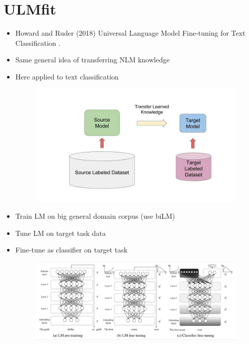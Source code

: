 \section{ULMfit}
\begin{itemize}
\item Howard and Ruder (2018) Universal Language Model Fine-tuning for Text Classification \cite{howard-ruder-2018-universal}. 
\item Same general idea of transferring NLM knowledge
\item  Here applied to text classification

\begin{figure}[h]
        	\includegraphics[scale = 0.29]{pics/ulmfit1.png}
        \end{figure}  

\item Train LM on big general domain corpus (use biLM)
\item Tune LM on target task data
\item Fine-tune as classifier on target task

\begin{figure}[h]
        	\includegraphics[scale = 0.2]{pics/ulmfit2.png}
        \end{figure}  

\end{itemize}



